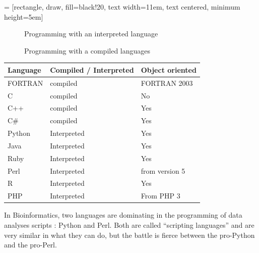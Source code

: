 \documentclass[article,10pt]{scrartcl}
\begin{document}
 = [rectangle, draw, fill=black!20, text width=11em, text centered, minimum height=5em]
\begin{figure}[h!]
\begin{center}
\end{center}
\caption{Programming with an interpreted language}
\end{figure}
\begin{figure}[h!]
\begin{center}
\end{center}
\caption{Programming with a compiled languages}
\end{figure}
\begin{center}
\begin{tabular}{|l|l|l|}
\hline
Language & Compiled / Interpreted & Object oriented\\ 
\hline 
FORTRAN & compiled & FORTRAN 2003 \\
\hline
C & compiled & No\\
\hline
C++ & compiled & Yes\\
\hline
C\# & compiled & Yes \\
\hline
Python & Interpreted & Yes \\
\hline
Java &  Interpreted & Yes \\
\hline
Ruby & Interpreted & Yes \\
\hline
Perl & Interpreted & from version 5\\
\hline
R & Interpreted & Yes\\
\hline
PHP & Interpreted & From PHP 3\\
\hline
\end{tabular}
\end{center}

In Bioinformatics, two languages are dominating in the programming of data analyses scripts : Python and Perl. Both are called ``scripting languages'' and are very similar in what they can do, but the battle is fierce between the pro-Python and the pro-Perl.
\end{document}
